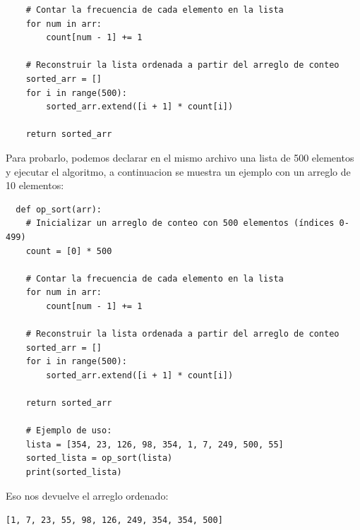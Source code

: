 \documentclass[answers, 11pt]{exam}
\begin{document}
\begin{questions}
\begin{solution}
\begin{verbatim}
    # Contar la frecuencia de cada elemento en la lista
    for num in arr:
        count[num - 1] += 1

    # Reconstruir la lista ordenada a partir del arreglo de conteo
    sorted_arr = []
    for i in range(500):
        sorted_arr.extend([i + 1] * count[i])

    return sorted_arr
  \end{verbatim}

  Para probarlo, podemos declarar en el mismo archivo una lista de 500 elementos y ejecutar el algoritmo, a continuacion 
  se muestra un ejemplo con un arreglo de 10 elementos:

  \begin{verbatim}
  def op_sort(arr):
    # Inicializar un arreglo de conteo con 500 elementos (índices 0-499)
    count = [0] * 500

    # Contar la frecuencia de cada elemento en la lista
    for num in arr:
        count[num - 1] += 1

    # Reconstruir la lista ordenada a partir del arreglo de conteo
    sorted_arr = []
    for i in range(500):
        sorted_arr.extend([i + 1] * count[i])

    return sorted_arr

    # Ejemplo de uso:
    lista = [354, 23, 126, 98, 354, 1, 7, 249, 500, 55]
    sorted_lista = op_sort(lista)
    print(sorted_lista)
  \end{verbatim}
  Eso nos devuelve el arreglo ordenado:
  \begin{center}
    \verb|[1, 7, 23, 55, 98, 126, 249, 354, 354, 500]|
  \end{center}

\end{solution}
  
\end{questions}
\end{document}
